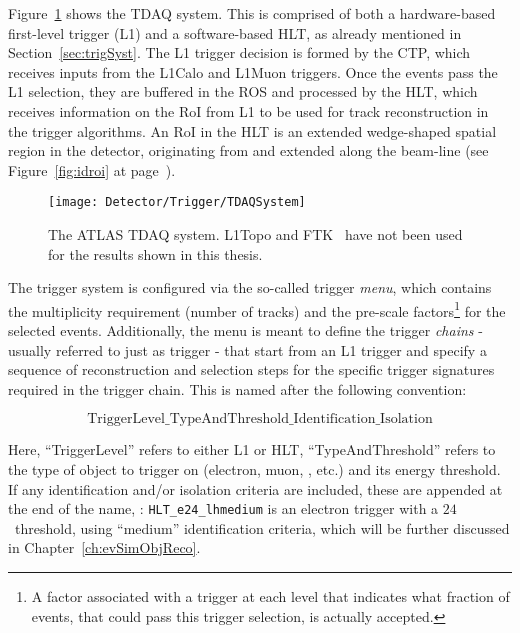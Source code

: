 		Figure~\ref{fig:TDAQSyst} shows the \ac{TDAQ} system. This is comprised of both a hardware-based first-level trigger (\ac{L1}) and a software-based \ac{HLT}, as already mentioned in Section~\ref{sec:trigSyst}. The \ac{L1} trigger decision is formed by the \ac{CTP}, which receives inputs from the \ac{L1Calo} and \ac{L1Muon} triggers. Once the events pass the \ac{L1} selection, they are buffered in the \ac{ROS} and processed by the \ac{HLT}, which receives information on the \ac{RoI} from \ac{L1} to be used for track reconstruction in the trigger algorithms. An \ac{RoI} in the \ac{HLT} is an extended wedge-shaped spatial region in the detector, originating from and extended along the beam-line (see Figure~\ref{fig:idroi} at page~\pageref{par:bjets_perf}). %

		\begin{figure}[!htb]
			\centering
			\texttt{[image: Detector/Trigger/TDAQSystem]}
			\caption{The \ac{ATLAS} \ac{TDAQ} system. \acs{L1Topo} and \ac{FTK}~\cite{ATLASTrigger2015} have not been used for the results shown in this thesis.}
			\label{fig:TDAQSyst}
		\end{figure}

		The trigger system is configured via the so-called trigger \textit{menu}, which contains the multiplicity requirement (number of tracks) and the pre-scale factors\footnote{A factor associated with a trigger at each level that indicates what fraction of events, that could pass this trigger selection, is actually accepted.} for the selected events. Additionally, the menu is meant to define the trigger \textit{chains} - usually referred to just as trigger - that start from an \ac{L1} trigger and specify a sequence of reconstruction and selection steps for the specific trigger signatures required in the trigger chain. This is named after the following convention: 

		$$\mathrm{TriggerLevel\_TypeAndThreshold\_Identification\_Isolation}$$

		\noindent Here, ``TriggerLevel'' refers to either \ac{L1} or \ac{HLT}, ``TypeAndThreshold'' refers to the type of object to trigger on (electron, muon, \met, etc.) and its energy threshold. If any identification and/or isolation criteria are included, these are appended at the end of the name, \eg: \texttt{HLT\_e24\_lhmedium} is an electron trigger with a $24$ \GeV\ threshold, using ``medium'' identification criteria, which will be further discussed in Chapter~\ref{ch:evSimObjReco}. 

